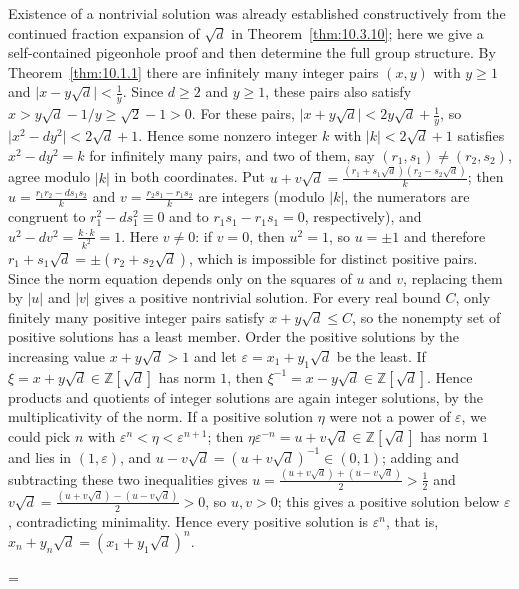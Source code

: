 \documentclass[11pt]{article}
\makeatletter
\theoremstyle{ntstyle}
\let\nt@closedisplay\]
\def\nt@guardedclose{\@ifnextchar\par{\nt@closeafterpar}{\@ifnextchar\end{\postdisplaypenalty\@M\nt@closedisplay}{\nt@closedisplay}}}
\def\nt@closeafterpar\par{\@ifnextchar\par{\nt@closeafterpar}{\@ifnextchar\end{\postdisplaypenalty\@M\nt@closedisplay\par}{\nt@closedisplay\par}}}
\renewenvironment{proof}[1][\proofname]{\par
  \pushQED{\qed}\normalfont\topsep\medskipamount\edef\nt@afterproof{\@endparpenalty=\the\@endparpenalty\relax}\@beginparpenalty\@M\@endparpenalty\@M\let\]\nt@guardedclose\trivlist\item[]\textit{#1\@addpunct{.}} \ignorespaces}{\ifvmode\addpenalty\@M\fi\popQED\nt@afterproof\endtrivlist\@endpefalse}
\makeatother
\begin{document}
\begin{proof} Existence of a nontrivial solution was
	already established constructively from the continued fraction expansion
	of $\sqrt{d}$ in Theorem~\ref{thm:10.3.10}; here we give a self-contained
	pigeonhole proof and then determine the full group structure. By
	Theorem~\ref{thm:10.1.1} there are infinitely many integer pairs $(x,y)$
	with $y\ge1$ and $\big|x-y\sqrt{d}\big|<\tfrac{1}{y}$. Since $d\ge2$ and
	$y\ge1$, these pairs also satisfy
	$x>y\sqrt d-1/y\ge\sqrt2-1>0$. For these pairs,
	$\big|x+y\sqrt{d}\big|<2y\sqrt{d}+\tfrac{1}{y}$, so
	$\big|x^2-dy^2\big|<2\sqrt{d}+1$. Hence some nonzero integer $k$ with
	$|k|<2\sqrt{d}+1$ satisfies $x^2-dy^2=k$ for infinitely many pairs,
	and two of them, say $(r_1,s_1)\neq(r_2,s_2)$, agree modulo $|k|$ in both
	coordinates. Put $u+v\sqrt{d}=\tfrac{(r_1+s_1\sqrt{d})(r_2-s_2\sqrt
			{d})}{k}$; then $u=\tfrac{r_1r_2-ds_1s_2}{k}$ and
	$v=\tfrac{r_2s_1-r_1s_2}{k}$ are integers (modulo $|k|$, the numerators are congruent to
		$r_1^2-ds_1^2\equiv0$ and to $r_1s_1-r_1s_1=0$, respectively), and
	$u^2-dv^2=\tfrac{k\cdot k}{k^2}=1$. Here $v\neq0$: if $v=0$, then
	$u^2=1$, so $u=\pm1$ and therefore
	$r_1+s_1\sqrt{d}=\pm(r_2+s_2\sqrt{d})$, which is impossible for distinct
	positive pairs. Since the norm equation depends only on the squares of
	$u$ and $v$, replacing them by $|u|$ and $|v|$ gives a positive
	nontrivial solution. For every real bound $C$, only finitely many
	positive integer pairs satisfy $x+y\sqrt d\le C$, so the nonempty set
	of positive solutions has a least member. Order the positive solutions
	by the increasing value $x+y\sqrt{d}>1$ and let
	$\varepsilon=x_1+y_1\sqrt{d}$ be the least. If
	$\xi=x+y\sqrt{d}\in\mathbb{Z}[\sqrt{d}]$ has norm $1$, then
	$\xi^{-1}=x-y\sqrt{d}\in\mathbb{Z}[\sqrt{d}]$. Hence products and
	quotients of integer solutions are again integer solutions, by the
	multiplicativity of the norm. If a positive solution $\eta$ were
	not a power of $\varepsilon$, we could pick $n$ with
	$\varepsilon^n<\eta<\varepsilon^{n+1}$; then
	$\eta\varepsilon^{-n}=u+v\sqrt{d}\in\mathbb{Z}[\sqrt{d}]$ has norm $1$ and lies in
	$(1,\varepsilon)$, and $u-v\sqrt{d}=(u+v\sqrt{d})^{-1}\in(0,1)$; adding and subtracting
	these two inequalities gives $u=\tfrac{(u+v\sqrt{d})+(u-v\sqrt
			{d})}{2}>\tfrac12$ and $v\sqrt{d}=\tfrac{(u+v\sqrt{d})-(u-v\sqrt
			{d})}{2}>0$, so $u,v>0$; this gives a positive solution below $\varepsilon$, contradicting
	minimality. Hence every positive solution is $\varepsilon^n$, that is,
	$x_n+y_n\sqrt{d}=(x_1+y_1\sqrt{d})^n$.


\end{proof}
\end{document}
